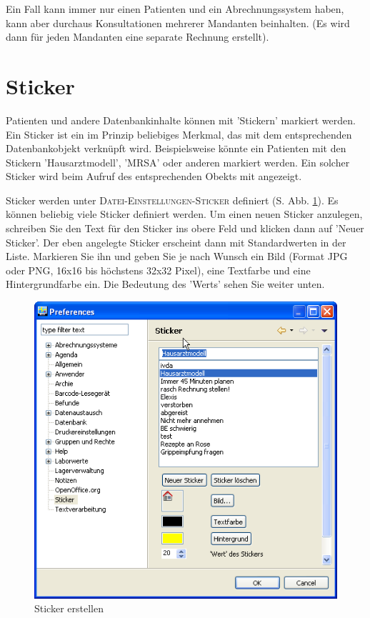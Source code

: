 Ein Fall kann immer nur einen Patienten und ein Abrechnungssystem haben, kann aber durchaus  Konsultationen mehrerer Mandanten beinhalten. (Es wird dann für jeden Mandanten eine separate Rechnung erstellt).

\section{Sticker}
\label{Etiketten}
Patienten und andere Datenbankinhalte können mit 'Stickern' markiert werden. Ein Sticker ist ein im Prinzip beliebiges Merkmal, das mit dem entsprechenden Datenbankobjekt verknüpft wird. Beispielsweise könnte ein Patienten mit den Stickern 'Hausarztmodell', 'MRSA' oder anderen markiert werden. Ein solcher Sticker wird beim Aufruf des entsprechenden Obekts mit angezeigt.

 Sticker werden unter \textsc{Datei-Einstellungen-Sticker} definiert (S. Abb. \ref{fig:etiketten1}). Es können beliebig viele Sticker definiert werden. Um einen neuen Sticker anzulegen, schreiben Sie den Text für den Sticker ins obere Feld und klicken dann auf 'Neuer Sticker'. Der eben angelegte Sticker erscheint dann mit Standardwerten in der Liste. Markieren Sie ihn und geben Sie je nach Wunsch ein Bild (Format JPG oder PNG, 16x16 bis höchstens 32x32 Pixel), eine Textfarbe und eine Hintergrundfarbe ein. Die Bedeutung des 'Werts' sehen Sie weiter unten.

\begin{figure}
    \includegraphics{images/etikette1}
    \caption{Sticker erstellen}
    \label{fig:etiketten1}
\end{figure}

